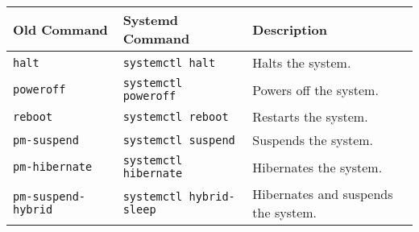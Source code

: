 \documentclass[a4paper]{article}
\begin{document}
\begin{center}
\vspace{6mm}

\begin{tabularx}{\textwidth}{ |X|X|X| }
\hline
\rowcolor[gray]{.8}
\bfseries Old Command & \bfseries Systemd Command  & \bfseries Description \\\hline
\tt halt              & \tt systemctl halt         & Halts the system. \\\hline
\tt poweroff          & \tt systemctl poweroff     & Powers off the system. \\\hline
\tt reboot            & \tt systemctl reboot       & Restarts the system. \\\hline
\tt pm-suspend        & \tt systemctl suspend      & Suspends the system. \\\hline
\tt pm-hibernate      & \tt systemctl hibernate    & Hibernates the system. \\\hline
\tt pm-suspend-hybrid & \tt systemctl hybrid-sleep & Hibernates and suspends the system. \\\hline
\end{tabularx}



\end{center}
\end{document}
